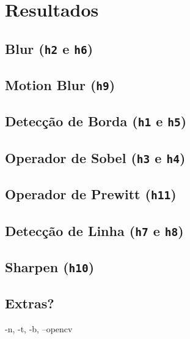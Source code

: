 \section{Resultados}

\subsection{Blur (\texttt{h2} e \texttt{h6})} \label{sec:blur}

    

\subsection{Motion Blur (\texttt{h9})} \label{sec:motion}

    

\subsection{Detecção de Borda (\texttt{h1} e \texttt{h5})} \label{sec:borda}

    

\subsection{Operador de Sobel (\texttt{h3} e \texttt{h4})} \label{sec:sobel}

    

\subsection{Operador de Prewitt (\texttt{h11})} \label{sec:grad}

    

\subsection{Detecção de Linha (\texttt{h7} e \texttt{h8})} \label{sec:linha}

    

\subsection{Sharpen (\texttt{h10})} \label{sec:sharpen}

    

\subsection{Extras?}

    -n, -t, -b, --opencv
